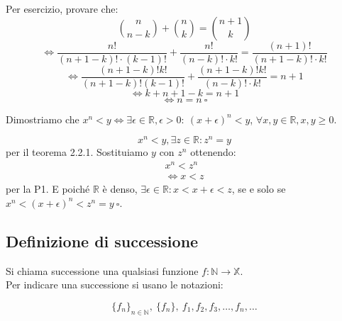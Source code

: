 \documentclass{article}
\begin{document}
Per esercizio, provare che:
\begin{equation*}
	\binom{n}{n-k}+ \binom{n}{k}= \binom{n+1}{k}
\end{equation*}
\vspace{1mm}
\begin{equation*}
	\iff \frac{n!}{(n+1-k)!\cdot (k-1)!}+\frac{n!}{(n-k)! \cdot k!}= \frac{(n+1)!}{(n+1-k)!\cdot k!}
\end{equation*}
\vspace{1mm}
\begin{equation*}
	\iff \frac{(n+1-k)!k!}{(n+1-k)!(k-1)!}+ \frac{(n+1-k)!k!}{(n-k)! \cdot k!}= n+1
\end{equation*}
\vspace{1mm}
\begin{equation*}
	\iff k+n+1-k=n+1
\end{equation*}
\begin{equation*}
	\iff n=n \ \square
\end{equation*}

Dimostriamo che $x^n<y \iff \exists \epsilon \in \mathbb{R}, \epsilon > 0 : \ (x+\epsilon)^n<y$, $\forall x,y \in \mathbb{R}, x,y \geq 0$.

\begin{dimostrazione}
	\begin{equation*}
		x^n<y, \exists z \in \mathbb{R}: z^n= y
	\end{equation*}
	per il teorema 2.2.1. Sostituiamo $y$ con $z^n$ ottenendo:
	\begin{align*}
		x^n<z^n \\
		\iff x<z
	\end{align*}
	per la P1. E poiché $\mathbb{R}$ è denso, $\exists \epsilon \in \mathbb{R}: x<x+\epsilon<z$, se e solo se $x^n<(x+\epsilon)^n<z^n=y \ \square$.

\end{dimostrazione}

\subsection{Definizione di successione}
Si chiama successione una qualsiasi funzione $f:\mathbb{N} \rightarrow \mathbb{X}$.\\
\indent Per indicare una successione si usano le notazioni:

\begin{equation*}
	\{f_n\}_{n \in \mathbb{N}}, \ \{f_n\}, \ f_1, f_2, f_3, \dots, f_n, \dots
\end{equation*}
\end{document}
